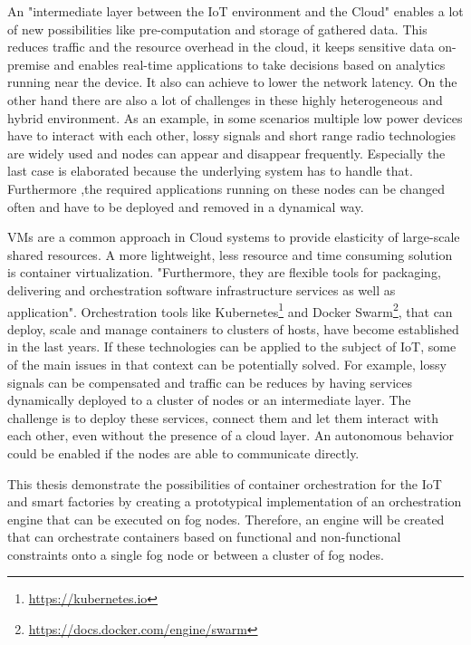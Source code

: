 An "intermediate layer between the IoT environment and the Cloud"\autocite[p.236]{Brito:2016} enables a lot of new possibilities like pre-computation and storage of gathered data.
This reduces traffic and the resource overhead in the cloud, it keeps sensitive data on-premise\autocite[cf.][p.236]{Brito:2016} and enables real-time applications to take decisions based on analytics running near the device.
It also can achieve to lower the network latency.
On the other hand there are also a lot of challenges in these highly heterogeneous and hybrid environment.
As an example, in some scenarios multiple low power devices have to interact with each other, lossy signals and short range radio technologies are widely used and nodes can appear and disappear frequently.\autocite[cf.][p. 325]{Yannuzzi:2014}
Especially the last case is elaborated because the underlying system has to handle that.
Furthermore ,the required applications running on these nodes can be changed often and have to be deployed and removed in a dynamical way.

\acp{VM} are a common approach in Cloud systems to provide elasticity of large-scale shared resources.\autocite[cf.][p. 117]{Pahl:2016}
A more lightweight, less resource and time consuming solution is container virtualization.
"Furthermore, they are flexible tools for packaging, delivering and orchestration software infrastructure services as well as application"\autocite[p. 117]{Pahl:2016}.
Orchestration tools like Kubernetes\footnote{\url{https://kubernetes.io}} and Docker Swarm\footnote{\url{https://docs.docker.com/engine/swarm}}, that can deploy, scale and manage containers to clusters of hosts, have become established in the last years.
If these technologies can be applied to the subject of \ac{IoT}, some of the main issues in that context can be potentially solved.
For example, lossy signals can be compensated and traffic can be reduces by having services dynamically deployed to a cluster of nodes or an intermediate layer.
The challenge is to deploy these services, connect them and let them interact with each other, even without the presence of a cloud layer.
An autonomous behavior could be enabled if the nodes are able to communicate directly.

This thesis demonstrate the possibilities of container orchestration for the \ac{IoT} and smart factories by creating a prototypical implementation of an orchestration engine that can be executed on fog nodes.
Therefore, an engine will be created that can orchestrate containers based on functional and non-functional constraints onto a single fog node or between a cluster of fog nodes.


